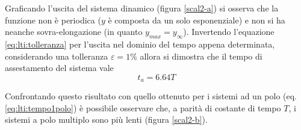 			Graficando l'uscita del sistema dinamico (figura \ref{scal2-a}) si osserva che la funzione non è periodica ($y$ è composta da un solo esponenziale) e non si ha neanche sovra-elongazione (in quanto $y_{max} = y_\infty$). Invertendo l'equazione \ref{eq:lti:tolleranza} per l'uscita nel dominio del tempo appena determinata, considerando una tolleranza $\varepsilon = 1\%$ allora si dimostra che il tempo di assestamento del sistema vale
			\begin{equation}\label{eq:lti:tempo2poli}
				t_a = 6.64T
			\end{equation}
			
			Confrontando questo risultato con quello ottenuto per i sistemi ad un polo (eq. \ref{eq:lti:tempo1polo}) è possibile osservare che, a parità di costante di tempo $T$, i sistemi a polo multiplo sono più lenti (figura \ref{scal2-b}).
		
